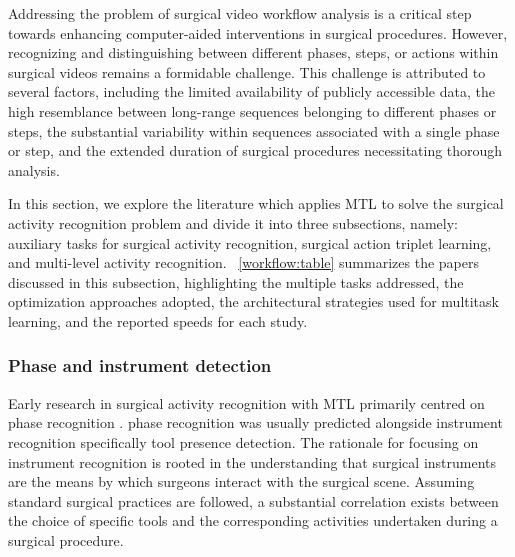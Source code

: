 \documentclass[times,twocolumn,final]{elsarticle}
\newcommand{\tabref}[1]{\tablename~\ref{#1}}
\begin{document}
Addressing the problem of surgical video workflow analysis is a critical step towards enhancing computer-aided interventions in surgical procedures. However, recognizing and distinguishing between different phases, steps, or actions within surgical videos remains a formidable challenge. This challenge is attributed to several factors, including the limited availability of publicly accessible data, the high resemblance between long-range sequences belonging to different phases or steps, the substantial variability within sequences associated with a single phase or step, and the extended duration of surgical procedures necessitating thorough analysis.

In this section, we explore the literature which applies MTL to solve the surgical activity recognition problem and divide it into three subsections, namely: auxiliary tasks for surgical activity recognition, surgical action triplet learning, and multi-level activity recognition. 
\tabref{workflow:table} summarizes the papers discussed in this subsection, highlighting the multiple tasks addressed, the optimization approaches adopted, the architectural strategies used for multitask learning, and the reported speeds for each study. 


\subsubsection{Phase and instrument detection}
Early research in surgical activity recognition with MTL primarily centred on phase recognition \citep{EndoNet,tecno,Sanchez-Matilla2022_data_centric,multi_task_recurrent_conv}. 
phase recognition was usually predicted alongside instrument recognition specifically tool presence detection. The rationale for focusing on instrument recognition is rooted in the understanding that surgical instruments are the means by which surgeons interact with the surgical scene. Assuming standard surgical practices are followed, a substantial correlation exists between the choice of specific tools and the corresponding activities undertaken during a surgical procedure. 
\end{document}
